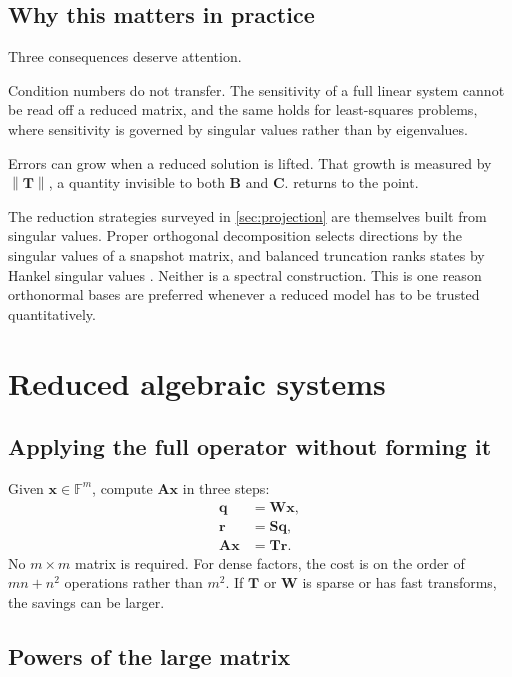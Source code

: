 \documentclass[11pt]{article}
\newcommand{\F}{\mathbb{F}}
\newcommand{\mat}[1]{\mathbf{#1}}
\newcommand{\vect}[1]{\mathbf{#1}}
\newcommand{\norm}[1]{\left\lVert #1\right\rVert}
\theoremstyle{definition}
\theoremstyle{remark}
\begin{document}
\subsection{Why this matters in practice}

Three consequences deserve attention.

Condition numbers do not transfer. The sensitivity of a full linear system cannot be read off a reduced matrix, and the same holds for least-squares problems, where sensitivity is governed by singular values rather than by eigenvalues.

Errors can grow when a reduced solution is lifted. That growth is measured by \(\norm{\mat{T}}\), a quantity invisible to both \(\mat{B}\) and \(\mat{C}\).  returns to the point.

The reduction strategies surveyed in \cref{sec:projection} are themselves built from singular values. Proper orthogonal decomposition selects directions by the singular values of a snapshot matrix, and balanced truncation ranks states by Hankel singular values \parencite{antoulas2005approximation}. Neither is a spectral construction. This is one reason orthonormal bases are preferred whenever a reduced model has to be trusted quantitatively.

\section{Reduced algebraic systems}
\label{sec:algebraic-systems}

\subsection{Applying the full operator without forming it}

Given \(\vect{x}\in\F^m\), compute \(\mat{A}\vect{x}\) in three steps:
\begin{align}
  \vect{q}&=\mat{W}\vect{x},
  \label{eq:apply-step1}\\
  \vect{r}&=\mat{S}\vect{q},
  \label{eq:apply-step2}\\
  \mat{A}\vect{x}&=\mat{T}\vect{r}.
  \label{eq:apply-step3}
\end{align}
No \(m\times m\) matrix is required. For dense factors, the cost is on the order of \(mn+n^2\) operations rather than \(m^2\). If \(\mat{T}\) or \(\mat{W}\) is sparse or has fast transforms, the savings can be larger.

\subsection{Powers of the large matrix}
\end{document}
